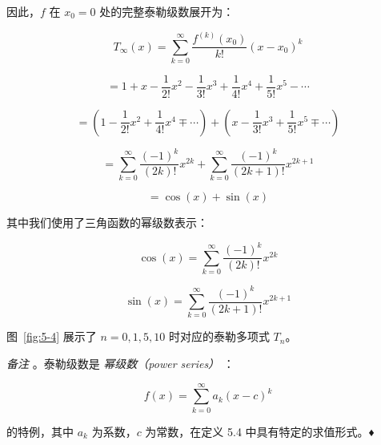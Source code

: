 \begin{notebox}
因此，$ f $ 在 $ x_0 = 0 $ 处的完整泰勒级数展开为：

\begin{equation}
T_\infty(x) = \sum_{k=0}^\infty \frac{f^{(k)}(x_0)}{k!} (x - x_0)^k
\tag{5.25a}\label{eq:5-25a}
\end{equation}

\begin{equation}
= 1 + x - \frac{1}{2!} x^2 - \frac{1}{3!} x^3 + \frac{1}{4!} x^4 + \frac{1}{5!} x^5 - \cdots
\tag{5.25b}\label{eq:5-25b}
\end{equation}

\begin{equation}
= \left( 1 - \frac{1}{2!} x^2 + \frac{1}{4!} x^4 \mp \cdots \right) + \left( x - \frac{1}{3!} x^3 + \frac{1}{5!} x^5 \mp \cdots \right)
\tag{5.25c}\label{eq:5-25c}
\end{equation}

\begin{equation}
= \sum_{k=0}^\infty \frac{(-1)^k}{(2k)!} x^{2k} + \sum_{k=0}^\infty \frac{(-1)^k}{(2k + 1)!} x^{2k+1}
\tag{5.25d}\label{eq:5-25d}
\end{equation}

\begin{equation}
= \cos(x) + \sin(x)
\tag{5.25e}\label{eq:5-25e}
\end{equation}

其中我们使用了三角函数的幂级数表示：

\begin{equation}
\cos(x) = \sum_{k=0}^\infty \frac{(-1)^k}{(2k)!} x^{2k}
\tag{5.26}\label{eq:5-26}
\end{equation}

\begin{equation}
\sin(x) = \sum_{k=0}^\infty \frac{(-1)^k}{(2k + 1)!} x^{2k+1}
\tag{5.27}\label{eq:5-27}
\end{equation}

图~\ref{fig:5-4} 展示了 $ n = 0, 1, 5, 10 $ 时对应的泰勒多项式 $ T_n $。
\end{notebox}

\emph{备注} 。泰勒级数是 \emph{幂级数（power series）} ：

\begin{equation}
f(x) = \sum_{k=0}^\infty a_k (x - c)^k
\tag{5.28}\label{eq:5-28}
\end{equation}

的特例，其中 $ a_k $ 为系数，$ c $ 为常数，在定义 5.4 中具有特定的求值形式。♦

